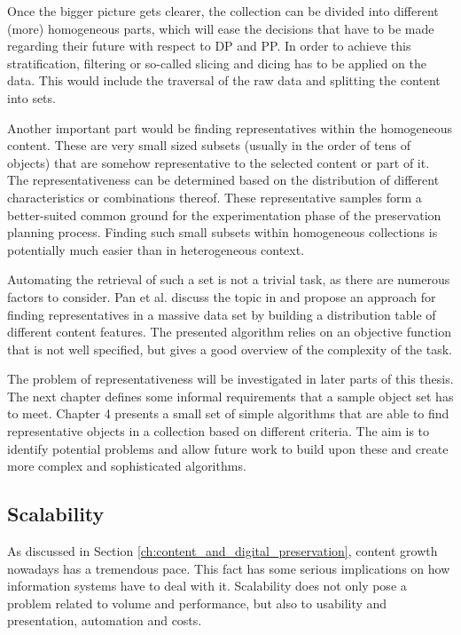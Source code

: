 Once the bigger picture gets clearer, the collection can be divided into different (more) homogeneous parts, which will ease the decisions that have to be made regarding their future with respect to DP and PP. In order to achieve this stratification, filtering or so-called slicing and dicing has to be applied on the data. This would include the traversal of the raw data and splitting the content into sets.

Another important part would be finding representatives within the homogeneous content. These are very small sized subsets (usually in the order of tens of objects) that are somehow representative to the selected content or part of it. The representativeness can be determined based on the distribution of different characteristics or combinations thereof. These representative samples form a better-suited common ground for the experimentation phase of the preservation planning process. Finding such small subsets within homogeneous collections is potentially much easier than in heterogeneous context. 

Automating the retrieval of such a set is not a trivial task, as there are numerous factors to consider. Pan et al. discuss the topic in \cite{Pan05findingrepresentative} and propose an approach for finding representatives in a massive data set by building a distribution table of different content features. The presented algorithm relies on an objective function that is not well specified, but gives a good overview of the complexity of the task.

The problem of representativeness will be investigated in later parts of this thesis. The next chapter defines some informal requirements that a sample object set has to meet. Chapter 4 presents a small set of simple algorithms that are able to find representative objects in a collection based on different criteria. The aim is to identify potential problems and allow future work to build upon these and create more complex and sophisticated algorithms.

\subsection{Scalability}
As discussed in Section \ref{ch:content_and_digital_preservation}, content growth nowadays has a tremendous pace. This fact has some serious implications on how information systems have to deal with it. Scalability does not only pose a problem related to volume and performance, but also to usability and presentation, automation and costs.

